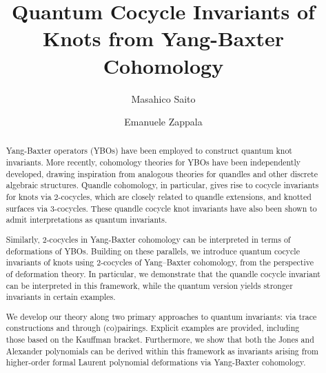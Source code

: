 \documentclass[11pt,fleqn]{amsart} %
\begin{document}


\title{Quantum Cocycle Invariants of Knots
from Yang-Baxter Cohomology} 
%   
%


\author{Masahico Saito} 
\address{Department of Mathematics and Statistics, 
	University of South Florida, Tampa, FL 33620} 

\author{Emanuele Zappala} 
\address{Department of Mathematics and Statistics, Idaho State University\\
	Physical Science Complex |  921 S. 8th Ave., Stop 8085 | Pocatello, ID 83209} 

%
\maketitle
%

\begin{abstract}
Yang-Baxter operators (YBOs) have been employed to construct quantum knot invariants. More recently, cohomology theories for YBOs have been independently developed, drawing inspiration from analogous theories for quandles and other discrete algebraic structures. Quandle cohomology, in particular, gives rise to cocycle invariants for knots via $2$-cocycles, which are closely related to quandle extensions,  and knotted surfaces via $3$-cocycles. These quandle cocycle knot invariants have also been shown to admit interpretations as quantum invariants.

Similarly, $2$-cocycles in Yang-Baxter cohomology can be interpreted in terms of deformations of YBOs. Building on these parallels, we introduce quantum cocycle invariants of knots using $2$-cocycles 
of Yang–Baxter cohomology, from the perspective of deformation theory. In particular, we demonstrate that the quandle cocycle invariant can be interpreted in this framework, while the quantum version yields stronger invariants in certain examples. 

We develop our theory along two primary approaches to quantum invariants: via trace constructions and through (co)pairings. Explicit examples are provided, including those based on the Kauffman bracket. Furthermore, we show that both the Jones and Alexander polynomials can be derived within this framework as invariants arising from higher-order formal Laurent polynomial deformations via Yang-Baxter cohomology.
		
\end{abstract}
\end{document}
